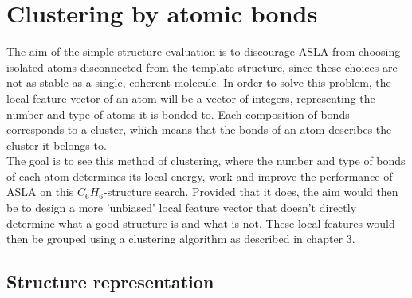 \chapter{Clustering by atomic bonds}
The aim of the simple structure evaluation is to discourage ASLA from choosing isolated atoms disconnected from the template structure, since these choices are not as stable as a single, coherent molecule. In order to solve this problem, the local feature vector of an atom will be a vector of integers, representing the number and type of atoms it is bonded to. Each composition of bonds corresponds to a cluster, which means that the bonds of an atom describes the cluster it belongs to. \\

The goal is to see this method of clustering, where the number and type of bonds of each atom determines its local energy, work and improve the performance of ASLA on this $C_6H_6$-structure search. Provided that it does, the aim would then be to design a more 'unbiased' local feature vector that doesn't directly determine what a good structure is and what is not. These local features would then be grouped using a clustering algorithm as described in chapter 3.


\section{Structure representation}

